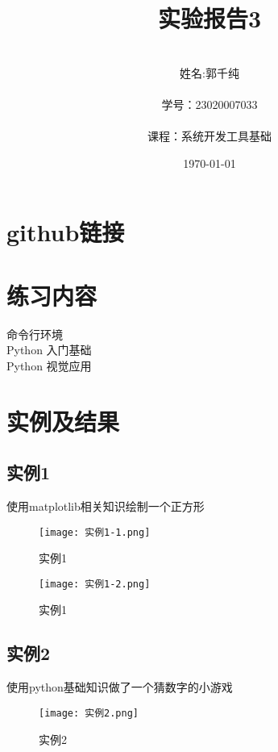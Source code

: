 \documentclass[a4paper, 12pt]{article}
\begin{document}
  \title{实验报告3}
  \author{\\姓名:郭千纯\\
		\\学号：23020007033\\
		\\课程：系统开发工具基础\\}
  \date{\today\\}
  \maketitle
{}
\tableofcontents
\newpage
{}
\section{github链接}


\section{练习内容}
命令行环境\\
Python 入门基础\\
Python 视觉应用\\

\section{实例及结果}

\subsection{实例1}
使用matplotlib相关知识绘制一个正方形

\begin{figure}[h!]
  \centering
  \texttt{[image: 实例1-1.png]}
  \caption{实例1}
\end{figure}

\begin{figure}[h!]
  \centering
  \texttt{[image: 实例1-2.png]}
  \caption{实例1}
\end{figure}

\subsection{实例2}
使用python基础知识做了一个猜数字的小游戏

\begin{figure}[h!]
  \centering
  \texttt{[image: 实例2.png]}
  \caption{实例2}
\end{figure}
\end{document}
